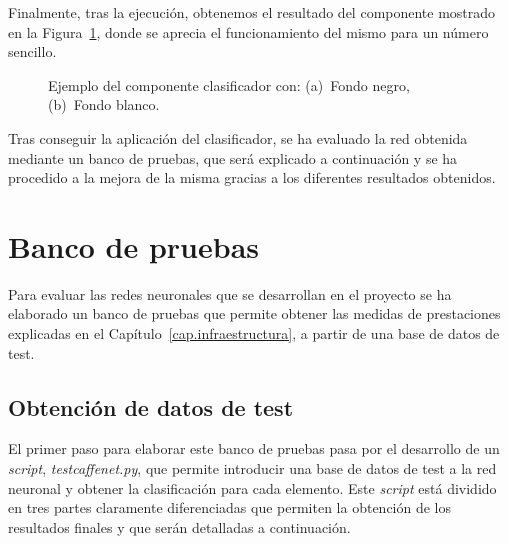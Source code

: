 Finalmente, tras la ejecución, obtenemos el resultado del componente mostrado en la Figura~\ref{fig.componente1}, donde se aprecia el funcionamiento del mismo para un número sencillo.

\begin{figure}[H]
	\begin{center}
		\hspace{10pt}
		\caption{Ejemplo del componente clasificador con: (a)~Fondo negro, (b)~Fondo blanco.}
		\label{fig.componente1}
	\end{center}
\end{figure}

Tras conseguir la aplicación del clasificador, se ha evaluado la red obtenida mediante un banco de pruebas, que será explicado a continuación y se ha procedido a la mejora de la misma gracias a los diferentes resultados obtenidos.

\section{Banco de pruebas} \label{sec.banco}
Para evaluar las redes neuronales que se desarrollan en el proyecto se ha elaborado un banco de pruebas que permite obtener las medidas de prestaciones explicadas en el Capítulo~\ref{cap.infraestructura}, a partir de una base de datos de test.

\subsection{Obtención de datos de test}
El primer paso para elaborar este banco de pruebas pasa por el desarrollo de un \textit{script}, \textit{testcaffenet.py}, que permite introducir una base de datos de test a la red neuronal y obtener la clasificación para cada elemento. Este \textit{script} está dividido en tres partes claramente diferenciadas que permiten la obtención de los resultados finales y que serán detalladas a continuación.

